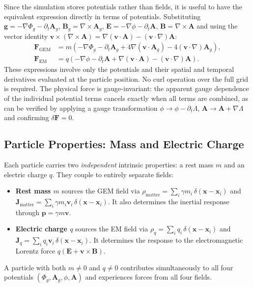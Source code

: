 \documentclass[11pt,a4paper]{article}
\newcommand{\vv}[1]{\mathbf{#1}}
\newcommand{\Phig}{\Phi_g}
\newcommand{\Ag}{\vv{A}_g}
\begin{document}
Since the simulation stores potentials rather than fields, it is useful to have the equivalent expression directly in terms of potentials.  Substituting $\vv{g} = -\nabla\Phig - \partial_t\Ag$, $\vv{B}_g = \nabla\times\Ag$, $\vv{E} = -\nabla\phi - \partial_t\vv{A}$, $\vv{B} = \nabla\times\vv{A}$ and using the vector identity $\vv{v}\times(\nabla\times\vv{A}) = \nabla(\vv{v}\cdot\vv{A}) - (\vv{v}\cdot\nabla)\vv{A}$:
\begin{align}
  \vv{F}_{\mathrm{GEM}} &= m\!\left(-\nabla\Phig - \partial_t\Ag
    + 4\nabla(\vv{v}\cdot\Ag) - 4(\vv{v}\cdot\nabla)\Ag\right), \label{eq:force_gem_pot} \\
  \vv{F}_{\mathrm{EM}}  &= q\!\left(-\nabla\phi - \partial_t\vv{A}
    + \nabla(\vv{v}\cdot\vv{A}) - (\vv{v}\cdot\nabla)\vv{A}\right). \label{eq:force_em_pot}
\end{align}
These expressions involve only the potentials and their spatial and temporal derivatives evaluated at the particle position.  No curl operation over the full grid is required.  The physical force is gauge-invariant: the apparent gauge dependence of the individual potential terms cancels exactly when all terms are combined, as can be verified by applying a gauge transformation $\phi\to\phi-\partial_t\Lambda$, $\vv{A}\to\vv{A}+\nabla\Lambda$ and confirming $\delta\vv{F}=0$.

\subsection{Particle Properties: Mass and Electric Charge}

Each particle carries two \emph{independent} intrinsic properties: a rest mass $m$ and an electric charge $q$.  They couple to entirely separate fields:
\begin{itemize}
  \item \textbf{Rest mass $m$} sources the GEM field via $\rho_{\mathrm{matter}} = \sum_i \gamma m_i\,\delta(\vv{x}-\vv{x}_i)$ and $\vv{J}_{\mathrm{matter}} = \sum_i \gamma m_i\vv{v}_i\,\delta(\vv{x}-\vv{x}_i)$.  It also determines the inertial response through $\vv{p} = \gamma m\vv{v}$.
  \item \textbf{Electric charge $q$} sources the EM field via $\rho_q = \sum_i q_i\,\delta(\vv{x}-\vv{x}_i)$ and $\vv{J}_q = \sum_i q_i\vv{v}_i\,\delta(\vv{x}-\vv{x}_i)$.  It determines the response to the electromagnetic Lorentz force $q(\vv{E}+\vv{v}\times\vv{B})$.
\end{itemize}
A particle with both $m\neq 0$ and $q\neq 0$ contributes simultaneously to all four potentials $(\Phig,\Ag,\phi,\vv{A})$ and experiences forces from all four fields.
\end{document}
